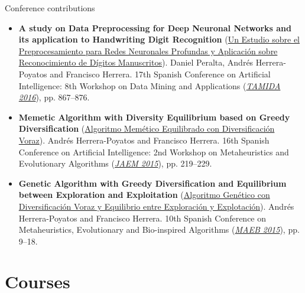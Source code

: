 \documentclass[10pt,a4paper,sans]{moderncv} %
\begin{document}
{\large \textcolor{color1}{Conference contributions}}

	\begin{itemize}
		\item \textbf{A study on Data Preprocessing for Deep Neuronal Networks and its application to Handwriting Digit Recognition} (\textcolor{colorl}{\href{https://www.researchgate.net/publication/308901913_Un_Estudio_sobre_el_Preprocesamiento_para_Redes_Neuronales_Profundas_y_Aplicacion_sobre_Reconocimiento_de_Digitos_Manuscritos}{Un Estudio sobre el Preprocesamiento para Redes Neuronales Profundas y Aplicación sobre Reconocimiento de Dígitos Manuscritos}}). Daniel Peralta, Andrés Herrera-Poyatos and Francisco Herrera. 17th Spanish Conference on Artificial Intelligence: 8th Workshop on Data Mining and Applications (\textcolor{colorl}{\textit{\href{http://www.congresocedi.es/en/tamida}{TAMIDA 2016}}}), pp. 867--876.
		\item \textbf{Memetic Algorithm with Diversity Equilibrium based on Greedy Diversification} (\textcolor{colorl}{\href{https://www.researchgate.net/publication/320701097_Algoritmo_Memetico_Equilibrado_con_Diversificacion_Voraz}{Algoritmo Memético Equilibrado con Diversificación Voraz}}). Andrés Herrera-Poyatos and Francisco Herrera. 16th Spanish Conference on Artificial Intelligence: 2nd Workshop on Metaheuristics and Evolutionary Algorithms (\textcolor{colorl}{\textit{\href{http://simd.albacete.org/caepia15/en/conference/jaem15/}{JAEM 2015}}}), pp. 219--229.
		\item  \textbf{Genetic Algorithm with Greedy Diversification and Equilibrium between Exploration and Exploitation} (\textcolor{colorl}{\href{https://www.researchgate.net/publication/320701127_Algoritmo_Genetico_con_Diversificacion_Voraz_y_Equilibrio_entre_Exploracion_y_Explotacion}{Algoritmo Genético con Diversificación Voraz y Equilibrio entre Exploración y Explotación}}). Andrés Herrera-Poyatos and Francisco Herrera. 10th Spanish Conference on Metaheuristics, Evolutionary and Bio-inspired Algorithms (\textcolor{colorl}{\textit{\href{http://www.eweb.unex.es/eweb/maeb2015/}{MAEB 2015}}}), pp. 9--18.
	\end{itemize}



\section{Courses}
\end{document}
